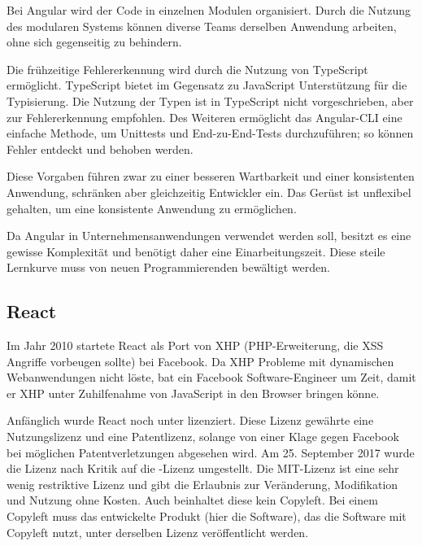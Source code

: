 Bei Angular wird der Code in einzelnen Modulen organisiert. Durch die Nutzung des modularen Systems können diverse Teams derselben Anwendung arbeiten, ohne sich gegenseitig zu behindern. \cite{wahlinWesentlichenVorteileAngular2017}

Die frühzeitige Fehlererkennung wird durch die Nutzung von TypeScript ermöglicht. \linebreak TypeScript bietet im Gegensatz zu JavaScript Unterstützung für die Typisierung. Die Nutzung der Typen ist in TypeScript nicht vorgeschrieben, aber zur Fehlererkennung empfohlen.
Des Weiteren ermöglicht das Angular-CLI eine einfache Methode, um Unittests und End-zu-End-Tests durchzuführen; so können Fehler entdeckt und behoben werden. \cite{wahlinWesentlichenVorteileAngular2017}

Diese Vorgaben führen zwar zu einer besseren Wartbarkeit und einer konsistenten Anwendung, schränken aber gleichzeitig Entwickler ein. Das Gerüst ist unflexibel gehalten, um eine konsistente Anwendung zu ermöglichen.

Da Angular in Unternehmensanwendungen verwendet werden soll, besitzt es eine gewisse Komplexität und benötigt daher eine Einarbeitungszeit. Diese steile Lernkurve muss von neuen Programmierenden bewältigt werden. \cite{ventzkemediaAngularVsReact2018}

\subsection{React}
Im Jahr 2010 startete React als Port von XHP (PHP-Erweiterung, die XSS Angriffe vorbeugen sollte) bei Facebook. Da XHP Probleme mit dynamischen Webanwendungen nicht löste, bat ein Facebook Software-Engineer um Zeit, damit er XHP unter Zuhilfenahme von JavaScript in den Browser bringen könne. \cite{dawsonJavaScriptHistoryHow2014}

Anfänglich wurde React noch unter  lizenziert. Diese Lizenz gewährte eine Nutzungslizenz und eine Patentlizenz, solange von einer Klage gegen Facebook bei möglichen Patentverletzungen abgesehen wird. Am 25. September 2017 wurde die Lizenz nach Kritik auf die -Lizenz umgestellt. \cite{kripalaniIfYouRe2017} \cite{larsonFacebookJustChanged2017} Die MIT-Lizenz ist eine sehr wenig restriktive Lizenz und gibt die Erlaubnis zur Veränderung, Modifikation und Nutzung ohne Kosten. Auch beinhaltet diese kein Copyleft. Bei einem Copyleft muss das entwickelte Produkt (hier die Software), das die Software mit Copyleft nutzt, unter derselben Lizenz veröffentlicht werden. \cite{wehnerSoftwareUnterMIT2020}

